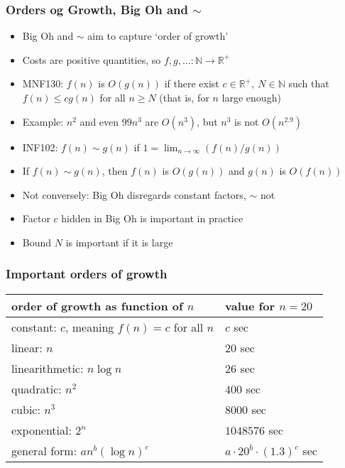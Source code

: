 \documentclass[handout]{beamer}
\newcommand{\Nat}{\mathbb{N}}
\newcommand{\Rea}{\mathbb{R}}
\begin{document}
\frame
  {
    
    \frametitle{Orders og Growth, Big Oh and $\sim$}

\begin{itemize}[<+->]

\item Big Oh and $\sim$ aim to capture `order of growth'
\item Costs are positive quantities, so $f,g,... : \Nat \to \Rea^+$
\item MNF130:  $f(n)$ is $O(g(n))$ if there exist 
$c\in\Rea^+,~N\in\Nat$ such that $f(n) \leq c g(n)$ for all $n\geq N$
(that is, for $n$ large enough)
\item Example: $n^2$ and even $99n^3$ are $O(n^3)$, but  $n^3$ is not $O(n^{2.9})$
\item INF102:  $f(n)\sim g(n)$ if $1 = \lim_{n\to\infty} (f(n) / g(n))$
\item If $f(n)\sim g(n)$, then $f(n)$ is $O(g(n))$ and $g(n)$ is $O(f(n))$
\item Not conversely: Big Oh disregards constant factors, $\sim$ not
\item Factor $c$ hidden in Big Oh is important in practice
\item Bound $N$ is important if it is large
\end{itemize}  
}

\frame
  {
    
    \frametitle{Important orders of growth}

\begin{tabular}{l | l}
order of growth as function of $n$ & value for $n=20$ \\\hline\hline
constant: $c$, meaning $f(n) = c$ for all $n$ & $c$ sec\\\hline
linear: $n$                                                               & $20$ sec \\\hline
linearithmetic: $n \log n$                                    & $26$ sec \\\hline
quadratic: $n^2$                                                   & $400$ sec\\\hline
cubic: $n^3$                                                           & $8000$ sec\\\hline
exponential: $2^n$                                               & $1048576$ sec\\\hline
general form: $a n^b (\log n)^c$ & $a\cdot 20^b \cdot(1.3)^c$ sec

\end{tabular}  
}
\end{document}
